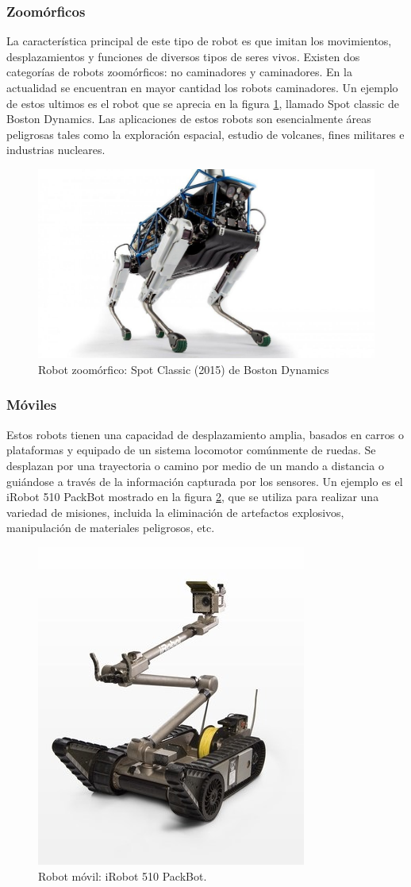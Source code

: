         \subsubsection{Zoomórficos}
        La característica principal de este tipo de robot es que imitan los movimientos, desplazamientos y funciones de diversos tipos de seres vivos. Existen dos categorías de robots zoomórficos: no caminadores y caminadores. En la actualidad se encuentran en mayor cantidad los robots caminadores. Un ejemplo de estos ultimos es el robot que se aprecia en la figura \ref{f:Cap2_general_7}, llamado Spot classic de Boston Dynamics. Las aplicaciones de estos robots son esencialmente áreas peligrosas tales como la exploración espacial, estudio de volcanes, fines militares e industrias nucleares. 
        
        \begin{figure}[htb]
            \centering
            \includegraphics[width=0.48\linewidth]{Main/Chapter2/Images2/Robot-Zoomorico.jpg}
            \caption{Robot zoomórfico: Spot Classic (2015) de Boston Dynamics \cite{cap2_spotrobot}
 }
            \label{f:Cap2_general_7}
        \end{figure}
        
        \newpage
        
        \subsubsection{Móviles}
        Estos robots tienen una capacidad de desplazamiento amplia, basados en carros o plataformas y equipado de un sistema locomotor comúnmente de ruedas. Se desplazan por una trayectoria o camino por medio de un mando a distancia o guiándose a través de la información capturada por los sensores. Un ejemplo es el iRobot 510 PackBot mostrado en la figura \ref{f:Cap2_general_8}, que se utiliza para realizar una variedad de misiones, incluida la eliminación de artefactos explosivos, manipulación de materiales peligrosos, etc.
        
        \begin{figure}[htb]
            \centering
            \includegraphics[width=0.27\linewidth]{Main/Chapter2/Images2/Robots-moviles.jpg}
            \caption{Robot móvil: 
            iRobot 510 PackBot.\cite{cap2_iRobot510}}
            \label{f:Cap2_general_8}
        \end{figure}
        
